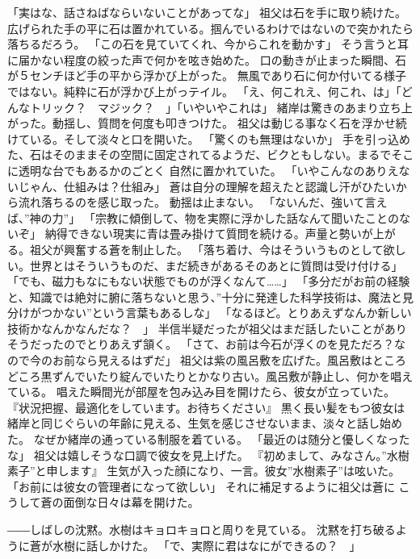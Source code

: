 \documentclass[uplatex]{utbook}
\begin{document}
「実はな、話さねばならいないことがあってな」
祖父は石を手に取り続けた。広げられた手の平に石は置かれている。掴んでいるわけではないので突かれたら落ちるだろう。
「この石を見ていてくれ、今からこれを動かす」
そう言うと耳に届かない程度の絞った声で何かを呟き始めた。
口の動きが止まった瞬間、石が５センチほど手の平から浮かび上がった。
無風であり石に何か付いてる様子ではない。純粋に石が浮かび上がっテイル。
「え、何これえ、何これ、は」「どんなトリック？　マジック？　」「いやいやこれは」
緒岸は驚きのあまり立ち上がった。動揺し、質問を何度も叩きつけた。
祖父は動じる事なく石を浮かせ続けている。そして淡々と口を開いた。
「驚くのも無理はないか」
手を引っ込めた、石はそのままその空間に固定されてるようだ、ビクともしない。まるでそこに透明な台でもあるかのごとく
自然に置かれていた。
「いやこんなのありえないじゃん、仕組みは？仕組み」
蒼は自分の理解を超えたと認識し汗がひたいから流れ落ちるのを感じ取った。
動揺は止まない。
「ないんだ、強いて言えば、”神の力”」
「宗教に傾倒して、物を実際に浮かした話なんて聞いたことのないぞ」
納得できない現実に青は畳み掛けて質問を続ける。声量と勢いが上がる。祖父が興奮する蒼を制止した。
「落ち着け、今はそういうものとして欲しい。世界とはそういうものだ、まだ続きがあるそのあとに質問は受け付ける」
「でも、磁力もなにもない状態でものが浮くなんて……」
「多分だがお前の経験と、知識では絶対に腑に落ちないと思う、”十分に発達した科学技術は、魔法と見分けがつかない”という言葉もあるしな」
「なるほど。とりあえずなんか新しい技術かなんかなんだな？　」
半信半疑だったが祖父はまだ話したいことがありそうだったのでとりあえず頷く。
「さて、お前は今石が浮くのを見ただろ？なので今のお前なら見えるはずだ」
祖父は紫の風呂敷を広げた。風呂敷はところどころ黒ずんでいたり綻んでいたりとかなり古い。風呂敷が静止し、何かを唱えている。
唱えた瞬間光が部屋を包み込み目を開けたら、彼女が立っていた。
『状況把握、最適化をしています。お待ちください』
黒く長い髪をもつ彼女は緒岸と同じぐらいの年齢に見える、生気を感じさせないまま、淡々と話し始めた。
なぜか緒岸の通っている制服を着ている。
「最近のは随分と優しくなったな」
祖父は嬉しそうな口調で彼女を見上げた。
『初めまして、みなさん。”水樹素子”と申します』
生気が入った顔になり、一言。彼女”水樹素子”は呟いた。
「お前には彼女の管理者になって欲しい」
それに補足するように祖父は蒼に
こうして蒼の面倒な日々は幕を開けた。


――しばしの沈黙。水樹はキョロキョロと周りを見ている。
沈黙を打ち破るように蒼が水樹に話しかけた。
「で、実際に君はなにができるの？　」
\end{document}
